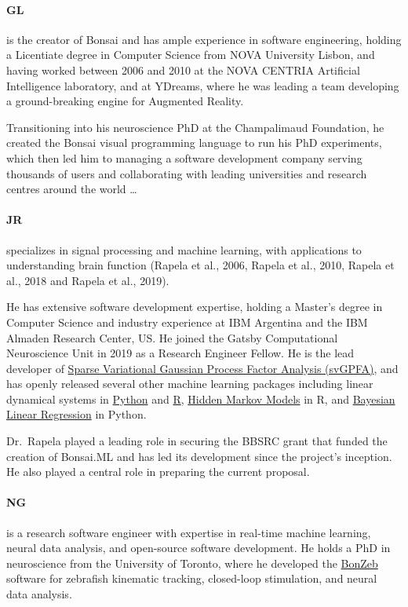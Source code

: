 \paragraph{GL} is the creator of Bonsai and has ample experience in software engineering, holding a Licentiate degree in Computer Science from NOVA University Lisbon, and having worked between 2006 and 2010 at the NOVA CENTRIA Artificial Intelligence laboratory, and at YDreams, where he was leading a team developing a ground-breaking engine for Augmented Reality.

Transitioning into his neuroscience PhD at the Champalimaud Foundation, he created the Bonsai visual programming language to run his PhD experiments, which then led him to managing a software development company serving thousands of users and collaborating with leading universities and research centres around the world \ldots

\paragraph{JR} specializes in
signal processing and machine learning, with applications to understanding
brain function (Rapela et al., 2006, Rapela et al., 2010, Rapela et al., 2018
and Rapela et al., 2019).

He has extensive software development expertise, holding a Master’s degree in
Computer Science and industry experience at IBM Argentina and the IBM Almaden
Research Center, US.
%
He joined the Gatsby Computational Neuroscience Unit in 2019 as a Research
Engineer Fellow.
%
He is the lead developer of \href{https://github.com/joacorapela/svGPFA}{Sparse
Variational Gaussian Process Factor Analysis (svGPFA)}, and has openly released
several other machine learning packages including linear dynamical systems in
\href{https://github.com/joacorapela/ssm}{Python} and
\href{https://github.com/joacorapela/kalmanFilter}{R},
\href{https://github.com/joacorapela/hiddenMarkovModels}{Hidden Markov Models}
in R, and
\href{https://github.com/joacorapela/bayesianLinearRegression}{Bayesian Linear
Regression} in Python.

Dr.~Rapela played a leading role in securing the BBSRC grant that funded the
creation of Bonsai.ML and has led its development since the project’s
inception. He also played a central role in preparing the current proposal.

\paragraph{NG} is a research software engineer with expertise in real-time machine learning, neural data analysis, and open-source software development. He holds a PhD in neuroscience from the University of Toronto, where he developed the \href{https://ncguilbeault.github.io/BonZeb/}{BonZeb} software for zebrafish kinematic tracking, closed-loop stimulation, and neural data analysis.

